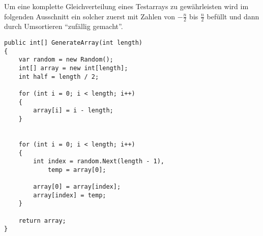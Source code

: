 Um eine komplette Gleichverteilung eines Testarrays zu gewährleisten wird im folgenden Ausschnitt ein solcher zuerst mit Zahlen von $-\frac{n}{2}$ bis $\frac{n}{2}$ befüllt und dann durch Umsortieren \enquote{zufällig gemacht}. \\
\begin{verbatim}
public int[] GenerateArray(int length)
{
    var random = new Random();
	int[] array = new int[length];
    int half = length / 2;
    
    for (int i = 0; i < length; i++)
    {
    	array[i] = i - length;
    }
    
    
    for (int i = 0; i < length; i++)
    {
    	int index = random.Next(length - 1),
        	temp = array[0];
            
        array[0] = array[index];
        array[index] = temp;
    }
    
    return array;
}
\end{verbatim}